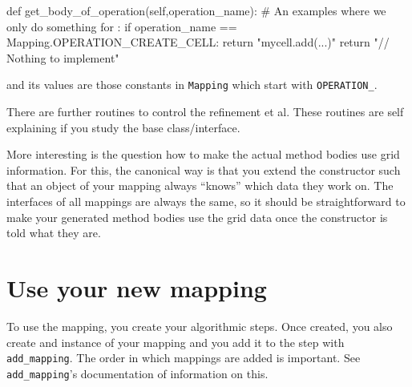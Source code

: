 \begin{code}
  def get_body_of_operation(self,operation_name):
    # An examples where we only do something for :
    if operation_name == Mapping.OPERATION_CREATE_CELL:
      return "mycell.add(...)\n"
    return "// Nothing to implement\n"
\end{code}

\noindent
and its values are those constants in \texttt{Mapping} which start with
\texttt{OPERATION\_}.


There are further routines to control the refinement et al.
These routines are self explaining if you study the base class/interface.


More interesting is the question how to make the actual method bodies use grid
information.
For this, the canonical way is that you extend the constructor such that an
object of your mapping always ``knows'' which data they work on. 
The interfaces of all mappings are always the same, so it should be
straightforward to make your generated method bodies use the grid data once the
constructor is told what they are.


\section{Use your new mapping}

To use the mapping, you create your algorithmic steps.
Once created, you also create and instance of your mapping and you add it to the
step with \texttt{add\_mapping}.
The order in which mappings are added is important.
See \texttt{add\_mapping}'s documentation of information on this.

